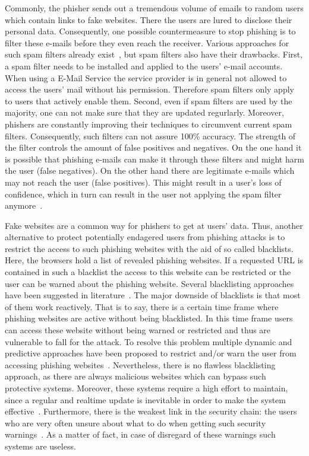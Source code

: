 \begin{description}[leftmargin=0cm]
	\item[Spam filters] Commonly, the phisher sends out a tremendous volume of emails to random users which contain links to fake websites. There the users are lured to disclose their personal data. Consequently, one possible countermeasure to stop phishing is to filter these e-mails before they even reach the receiver. Various approaches for such spam filters already exist~\cite{bergholz2010new,chandrasekaran2006phishing,fette2007learning}, but spam filters also have their drawbacks. First, a spam filter needs to be installed and applied to the users' e-mail accounts. When using a E-Mail Service the service provider is in general not allowed to access the users' mail without his permission. Therefore spam filters only apply to users that actively enable them. Second, even if spam filters are used by the majority, one can not make sure that they are updated regurlarly. Moreover, phishers are constantly improving their techniques to circumvent current spam filters. Consequently, such filters can not assure 100\% accuracy. The strength of the filter controls the amount of false positives and negatives. On the one hand it is possible that phishing e-mails can make it through these filters and might harm the user (false negatives). On the other hand there are legitimate e-mails which may not reach the user (false positives). This might result in a user's loss of confidence, which in turn can result in the user not applying the spam filter anymore~\cite{olivo2011obtaining}.
	\item[Blacklists] Fake websites are a common way for phishers to get at users' data. Thus, another alternative to protect potentially endagered users from phishing attacks is to restrict the access to such phishing websites with the aid of so called blacklists. Here, the browsers hold a list of revealed phishing websites. If a requested URL is contained in such a blacklist the access to this website can be restricted or the user can be warned about the phishing website. Several blacklisting approaches have been suggested in literature~\cite{ma2009beyond, zhang2008highly}. The major downside of blacklists is that most of them work reactively. That is to say, there is a certain time frame where phishing websites are active without being blacklisted. In this time frame users can access these website without being warned or restricted and thus are vulnerable to fall for the attack. To resolve this problem multiple dynamic and predictive approaches have been proposed to restrict and/or warn the user from accessing phishing websites~\cite{prakash2010phishnet, obied2009fraudulent}. Nevertheless, there is no flawless blacklisting approach, as there are always malicious websites which can bypass such protective systems. Moreover, these systems require a high effort to maintain, since a regular and realtime update is inevitable in order to make the system effective~\cite{purkait2012phishing}. Furthermore, there is the weakest link in the security chain: the users who are very often unsure about what to do when getting such security warnings~\cite{bakhshi2009social}. As a matter of fact, in case of disregard of these warnings such systems are useless.

\end{description}
